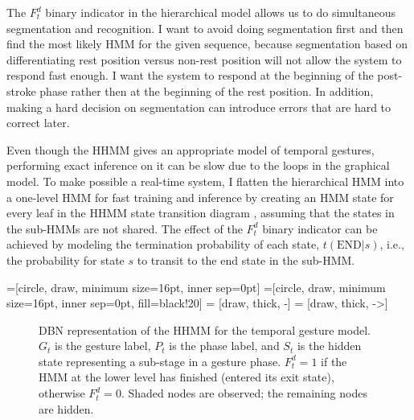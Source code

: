 The $F_t^d$ binary indicator in the hierarchical model allows us to do
simultaneous segmentation and recognition. I want to avoid doing segmentation first and then find the most
likely HMM for the given sequence, because segmentation based on
differentiating rest position versus non-rest position will not allow the system
to respond fast enough. I want the system to respond at the beginning of the
post-stroke phase rather then at the beginning of the rest position. In
addition, making a hard decision on segmentation can introduce errors that
are hard to correct later. 

Even though the HHMM gives an appropriate model of temporal gestures,
performing exact inference on it can be slow due to the loops in the graphical
model. To make possible a real-time system, I flatten the hierarchical HMM into
a one-level HMM for fast training and inference by creating an HMM state for
every leaf in the HHMM state transition diagram \cite{murphy02}, assuming that
the states in the sub-HMMs are not shared. The effect of the $F_t^d$ binary
indicator can be achieved by modeling the termination probability of each
state, $t(\text{END}|s)$, i.e., the probability for state $s$ to transit to the
end state in the sub-HMM.

=[circle, draw, minimum size=16pt, inner sep=0pt]
=[circle, draw, minimum size=16pt, inner sep=0pt,
               fill=black!20] 
 = [draw, thick, -]
 = [draw, thick, ->]

\begin{figure}[tbh]
\centering
  \caption{DBN representation of the HHMM for the temporal gesture model. $G_t$ is the gesture label, $P_t$ is the
phase label, and $S_t$ is the hidden state representing a sub-stage in a
gesture phase. $F_t^d = 1$ if the HMM at the lower level has finished
(entered its exit state), otherwise $F_t^d = 0$. Shaded nodes are observed; the
remaining nodes are hidden.}
  \label{fig:ahmm}
\end{figure}

